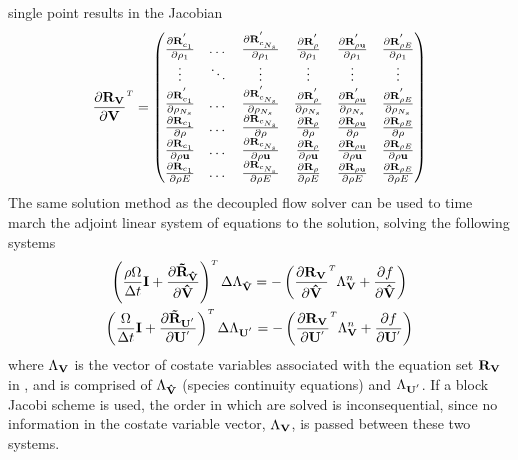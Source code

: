 single point results in the Jacobian
\begin{gather}
  \drvdv = 
  \begin{pmatrix}
    \tpdiff{\rho_1}{c_1}      & \dots  & \tpdiff{\rho_1}{c_{N_s}}     & \tpdiff{\rho_1}{\rho}     & \tpdiff{\rho_1}{\rho \vu}     &  \tpdiff{\rho_1}{\rho E}  \\
    \vdots                    & \ddots & \vdots                       & \vdots                    & \vdots                        & \vdots                    \\
    \tpdiff{\rho_{N_s}}{c_1}  & \dots  & \tpdiff{\rho_{N_s}}{c_{N_s}} & \tpdiff{\rho_{N_s}}{\rho} & \tpdiff{\rho_{N_s}}{\rho \vu} &  \tpdiff{\rho_{N_s}}{\rho E}    \\
    \tdiff{\rho}{c_1}         & \dots  & \tdiff{\rho}{c_{N_s}}        & \tdiff{\rho}{\rho}        & \tdiff{\rho}{\rho \vu}        &  \tdiff{\rho}{\rho E}     \\
    \tdiff{\rho \vu}{c_1}     & \dots  & \tdiff{\rho \vu}{c_{N_s}}    & \tdiff{\rho \vu}{\rho}    & \tdiff{\rho \vu}{\rho \vu}    &  \tdiff{\rho \vu}{\rho E} \\
    \tdiff{\rho E}{c_1}       & \dots  & \tdiff{\rho E}{c_{N_s}}      & \tdiff{\rho E}{\rho}      & \tdiff{\rho E}{\rho \vu}      &  \tdiff{\rho E}{\rho E}
  \end{pmatrix}
  \label{dc-full-system}
\end{gather}
The same solution method as the decoupled flow solver can be used to time march
the adjoint linear system of equations to the solution, solving the following
systems
\begin{gather}
  \left(
  \frac{\rho \vol}{\Delta t} \mi + \pd{\mathbf{\tilde{R}_{\Vhat}}}{\Vhat}
  \right)^{\mathsmaller T} \Delta \adjlam{\Vhat}
  =
  -\left(\pd{\rv{}}{\Vhat}^{\mathsmaller T}\adjlam{\mv}^n + \pd{f}{\Vhat} \right)
  \label{dc-species-adj-time} \\
  \left(
  \frac{\vol}{\Delta t} \mi + \pd{\mathbf{\tilde{R}_{\Up}}}{\Up}
  \right)^{\mathsmaller T} \Delta \adjlam{\Up}
  =
  -\left(\pd{\rv{}}{\Up}^{\mathsmaller T}\adjlam{\mv}^n + \pd{f}{\Up} \right)
  \label{dc-mixture-adj-time}
\end{gather}
where $\Lambda_{\mathbf V}$ is the vector of costate variables associated with the
equation set $\mathbf R_{{\mathbf V}_{}}$ in , and is comprised of $\Lambda_{\mathbf{\hat{V}}}$
(species continuity equations) and $\Lambda_{\mathbf{U}^{'}}$.  If a block Jacobi scheme is
used, the order in which  are
solved is inconsequential, since no information in the costate variable vector,
$\Lambda_{\mathbf V}$, is passed between these two systems.

